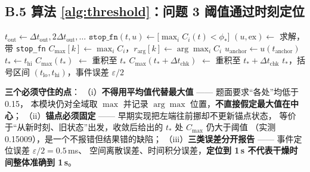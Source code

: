 \subsection*{B.5 算法 \ref{alg:threshold}：问题 3 阈值通过时刻定位}

\begin{algorithm}[H]
\caption{阈值通过时刻定位（\texttt{problem3.py}：\texttt{locate\_threshold}，第 114--208 行）}
\label{alg:threshold}
\BlankLine
{}
$t_{\text{out}} \gets \Delta t_{\text{out}},2\Delta t_{\text{out}},\dots$
$\texttt{stop\_fn}(t,u) \gets \bigl[\max_i C_i(t)<\phi_*\bigr]$\;
$(u,\text{ex}) \gets$ 求解，带 \texttt{stop\_fn}\;
$C_{\max}[k] \gets \max_i C_i$，$r_{\arg}[k] \gets \arg\max_i C_i$
\BlankLine
{}
$u_{\text{anchor}} \gets u(t_{\text{anchor}})$\;
\BlankLine
{}
$t_* \gets t_{\text{hi}}$\;
\BlankLine
{}
$C_{\max}(t_*)$ $\gets$ 重积至 $t_*$\;
$C_{\max}(t_*+\Delta t_{\text{chk}})$ $\gets$ 重积至 $t_*+\Delta t_{\text{chk}}$
\Return $t_*$，括号区间 $(t_{\text{lo}},t_{\text{hi}})$，事件误差 $\varepsilon/2$\;
\end{algorithm}

\noindent\textbf{三个必须守住的点}：
（i）\textbf{不得用平均值代替最大值} —— 题面要求``各处''均低于 0.15，
本模块仍对全域取 $\max$ 并记录 $\arg\max$ 位置，\textbf{不直接假定最大值在中心}；
（ii）\textbf{锚点必须固定} —— 早期实现把左端往前挪却不更新锚点状态，
等价于``从新时刻、旧状态''出发，收敛后给出的 $t_*$ 处 $C_{\max}$ 仍大于阈值
（实测 0.15009），是一个不报错但结果错的缺陷；
（iii）\textbf{三类误差分开报告} —— 事件定位误差 $\varepsilon/2=0.5$\,ms、
空间离散误差、时间积分误差，\textbf{定位到 1\,s 不代表干燥时间整体准确到 1\,s}。

